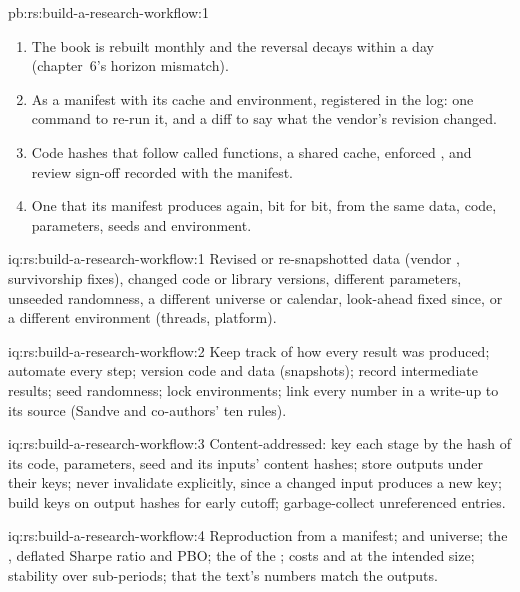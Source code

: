 \begin{solution}{pb:rs:build-a-research-workflow:1}
\begin{enumerate}
costs at size, or whether the text matches the numbers.
\item The book is rebuilt monthly and the reversal decays within a day (chapter~6's horizon mismatch).
\item As a manifest with its cache and environment, registered in the log: one command to re-run it, and a diff to say what the vendor's revision changed.
\item Code hashes that follow called functions, a shared cache, enforced , and review sign-off recorded with the manifest.
\item One that its manifest produces again, bit for bit, from the same data, code, parameters, seeds and environment.
\end{enumerate}
\end{solution}

\begin{solution}{iq:rs:build-a-research-workflow:1}
Revised or re-snapshotted data (vendor , survivorship fixes), changed code or library versions, different parameters, unseeded randomness, a different
universe or calendar, look-ahead fixed since, or a different environment (threads, platform).
\end{solution}

\begin{solution}{iq:rs:build-a-research-workflow:2}
Keep track of how every result was produced; automate every step; version code and data (snapshots); record intermediate results; seed randomness; lock
environments; link every number in a write-up to its source (Sandve and co-authors' ten rules).
\end{solution}

\begin{solution}{iq:rs:build-a-research-workflow:3}
Content-addressed: key each stage by the hash of its code, parameters, seed and its inputs' content hashes; store outputs under their keys; never invalidate
explicitly, since a changed input produces a new key; build keys on output hashes for early cutoff; garbage-collect unreferenced entries.
\end{solution}

\begin{solution}{iq:rs:build-a-research-workflow:4}
Reproduction from a manifest;  and universe; the , deflated Sharpe ratio and PBO; the  of the ; costs and
 at the intended size; stability over sub-periods; that the text's numbers match the outputs.
\end{solution}

